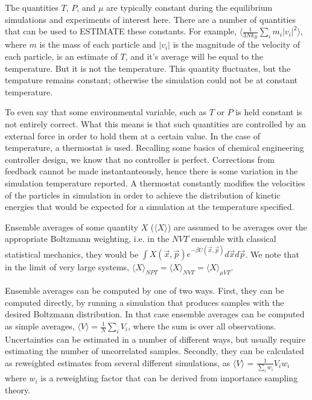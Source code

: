 \documentclass[aps,pre,twocolumn,nofootinbib,superscriptaddress,linenumbers,10pt, draft,tightenlines]{revtex4-1}
\begin{document}
The quantities $T$, $P$, and $\mu$ are typically constant during the
equilibrium simulations and experiments of interest here. 
There are a number of quantities that can
be used to ESTIMATE these constants. For example, $\langle
\frac{1}{3Nk_B}\sum_i m_i |v_i|^2\rangle$, where $m$ is the mass of each
particle and $|v_i|$ is the magnitude of the velocity of each
particle, is an estimate of $T$, and it's average will be equal to
the temperature. But it is not the temperature. This quantity
fluctuates, but the tempature remains constant; otherwise the
simulation could not be at constant temperature.

To even say that some environmental variable, such as $T$ or $P$ is held 
constant is not entirely correct. What this means is that such quantities 
are controlled by an external force in order to hold them at a certain
value. In the case of temperature, a thermostat is used. Recalling some
basics of chemical engineering controller design, we know that no controller
is perfect. Corrections from feedback cannot be made instantanteously, hence 
there is some variation in the simulation temperature reported. 
A thermostat constantly modifies the velocities of the particles
in simulation in order to achieve the distribution of kinetic energies that 
would be expected for a simulation at the temperature specified.

Ensemble averages of some quantity $X$ ($\langle X \rangle$) are
assumed to be averages over the appropriate Boltzmann weighting,
i.e. in the $NVT$ ensemble with classical statistical mechanics, they
would be $\int X(\vec{x},\vec{p}) e^{-\beta U(\vec{x},\vec{p})} d\vec{x}d\vec{p}$. We
note that in the limit of very large systems, $\langle X \rangle_{NPT}
= \langle X \rangle_{NVT} = \langle X \rangle_{\mu VT}$.

Ensemble averages can be computed by one of two ways. First, they can
be computed directly, by running a simulation that produces samples
with the desired Boltzmann distribution.  In that case ensemble 
averages can be computed as simple averages, $\langle V \rangle =
\frac{1}{N}\sum_i V_i$, where the sum is over all observations.
Uncertainties can be estimated in a number of different ways, but
usually require estimating the number of uncorrelated
samples. Secondly, they can be calculated as reweighted estimates from
several different simulations, as $\langle V \rangle$ =
$\frac{1}{\sum_i w_i} V_i w_i$ where $w_i$ is a reweighting factor
that can be derived from importance sampling theory. 
\end{document}

